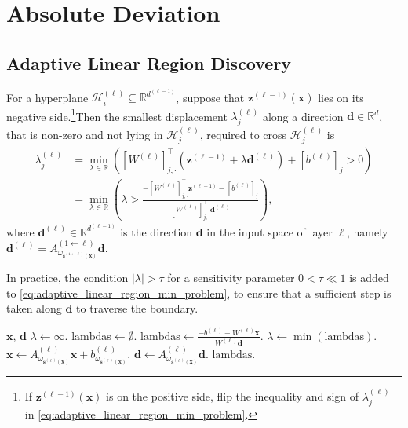 \section{Absolute Deviation}\label{sec:absolute_deviation}

\subsection{Adaptive Linear Region Discovery}

For a hyperplane $\mathcal{H}^{(\ell)}_i\subseteq\mathbb{R}^{d^{(\ell-1)}}$, suppose that $\mathbf{z}^{(\ell-1)}(\mathbf{x})$ lies on its negative side.\footnote{If $\mathbf{z}^{(\ell-1)}(\mathbf{x})$ is on the positive side, flip the inequality and sign of $\lambda^{(\ell)}_j$ in \eqref{eq:adaptive_linear_region_min_problem}.}Then the smallest displacement $\lambda^{(\ell)}_j$ along a direction $\mathbf{d}\in\mathbb{R}^{d}$, that is non-zero and not lying in $\mathcal{H}^{(\ell)}_j$, required to cross $\mathcal{H}^{(\ell)}_j$ is
\begin{align}\label{eq:adaptive_linear_region_min_problem}
    \lambda^{(\ell)}_j&=\min_{\lambda\in\mathbb{R}}\left(\left[W^{(\ell)}\right]_{j,\cdot}^\top\left(\mathbf{z}^{(\ell-1)}+\lambda\mathbf{d}^{(\ell)}\right)+\left[b^{(\ell)}\right]_j>0\right)\nonumber\\&=\min_{\lambda\in\mathbb{R}}\left(\lambda>\frac{-\left[W^{(\ell)}\right]_{j,\cdot}^\top\mathbf{z}^{(\ell-1)}-\left[b^{(\ell)}\right]_j}{\left[W^{(\ell)}\right]_{j,\cdot}^\top\mathbf{d}^{(\ell)}}\right),
\end{align}
where $\mathbf{d}^{(\ell)}\in\mathbb{R}^{d^{(\ell-1)}}$ is the direction $\mathbf{d}$ in the input space of layer $\ell$, namely $\mathbf{d}^{(\ell)}=A_{\omega_{\mathbf{s}^{(1\leftarrow\ell)}\left(\mathbf{x}\right)}}^{(1\leftarrow\ell)}\mathbf{d}$.

In practice, the condition $\vert\lambda\vert>\tau$ for a sensitivity parameter $0<\tau\ll1$ is added to \eqref{eq:adaptive_linear_region_min_problem}, to ensure that a sufficient step is taken along $\mathbf{d}$ to traverse the boundary.

\begin{algorithm}
\caption{Minimum displacement finder.}\label{alg:min_displacement_finder}
\begin{algorithmic}
\Require $\mathbf{x}$, $\mathbf{d}$
\State $\lambda\leftarrow\infty$.
\State $\text{lambdas}\leftarrow\emptyset$.
\State $\text{lambdas}\leftarrow\frac{-b^{(\ell)}-W^{(\ell)}\mathbf{x}}{W^{(\ell)}\mathbf{d}}$. 
\State $\lambda\leftarrow\min(\text{lambdas})$.
\EndIf
\State $\mathbf{x}\leftarrow A^{(\ell)}_{\omega_{\mathbf{s}^{(\ell)}\left(\mathbf{x}\right)}}\mathbf{x}+b^{(\ell)}_{\omega_{\mathbf{s}^{(\ell)}\left(\mathbf{x}\right)}}$.
\State $\mathbf{d}\leftarrow A^{(\ell)}_{\omega_{\mathbf{s}^{(\ell)}\left(\mathbf{x}\right)}}\mathbf{d}$.
\EndFor
\State \Return $\text{lambdas}$.
\end{algorithmic}
\end{algorithm}

